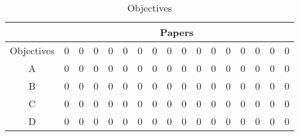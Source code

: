 \documentclass[a4paper, 11pt, twoside, onecolumn, openany]{article}
\begin{document}
\begin{comment}
\begin{table}[!htb]
\centering
\begin{tabular}{c|c|c|c|c|c|c|c|c|c|c|c|c|c|c|c|c|}
\cline{2-17}
& Scores \\ \hline
\multicolumn{1}{|c|}{Cycle 1} & 1 - 18 - 2 - 17 \\ \hline
\multicolumn{1}{|c|}{Cycle 2} & 4 - 15 - 5 - 14 \\ \hline
\multicolumn{1}{|c|}{Cycle 3} & 6 - 13 - 8 - 12 \\
\hline
\end{tabular}
\caption{T-Matrix.}
\label{table:tcycles}
\end{table}	
\end{comment}

\begin{table}[!htb]
	\centering
	\begin{tabular}{|c|c|c|c|c|c|c|c|c|c|c|c|c|c|c|c|c|}
		\hline
		& \multicolumn{16}{|c|}{Papers} \\ \hline
		Objectives & 0 & 0 & 0 & 0 & 0 & 0 & 0 & 0 & 0 & 0 & 0 & 0 & 0 & 0 & 0 & 0 \\ \hline %
		A & 0 & 0 & 0 & 0 & 0 & 0 & 0 & 0 & 0 & 0 & 0 & 0 & 0 & 0 & 0 & 0 \\ \hline
		B & 0 & 0 & 0 & 0 & 0 & 0 & 0 & 0 & 0 & 0 & 0 & 0 & 0 & 0 & 0 & 0 \\ \hline
		C & 0 & 0 & 0 & 0 & 0 & 0 & 0 & 0 & 0 & 0 & 0 & 0 & 0 & 0 & 0 & 0 \\ \hline
		D & 0 & 0 & 0 & 0 & 0 & 0 & 0 & 0 & 0 & 0 & 0 & 0 & 0 & 0 & 0 & 0 \\ \hline
	\end{tabular}
	\caption{Objectives}
	\label{table:objectives}
\end{table}	
\end{document}

